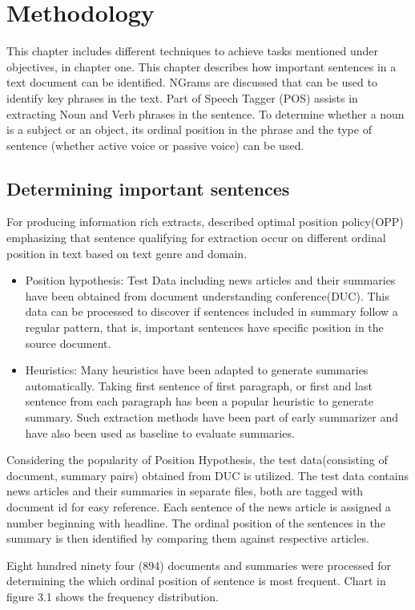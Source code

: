 \chapter{Methodology}
This chapter includes different techniques to achieve tasks mentioned under objectives, in chapter one. This chapter describes how important sentences in a text document
can be identified. NGrams are discussed that can be used to identify key phrases in the text. Part of Speech Tagger (POS) assists in extracting Noun and Verb phrases
in the sentence. To determine whether a noun is a subject or an object, its ordinal position in the phrase and the type of sentence (whether active voice or passive
 voice) can 
be used. 

\section{Determining important sentences}
 For producing information rich extracts,  described optimal position policy(OPP) emphasizing that sentence qualifying for extraction occur on different 
 ordinal position in text based on text genre and domain. 
\begin{itemize}
 \item Position hypothesis: Test Data including news articles and their summaries have been obtained from document understanding conference(DUC). This data can be processed
to discover if sentences included in summary follow a regular pattern, that is, important sentences have specific position in the source document. 
 \item Heuristics: Many heuristics have been adapted to generate summaries automatically. Taking first sentence of first paragraph, or first and last sentence from each paragraph
 has been a popular heuristic to generate summary. Such extraction methods have been part of early summarizer and have also been used as  baseline to evaluate summaries. 
\end{itemize}

Considering the popularity of Position Hypothesis, the test data(consisting of document, summary pairs) obtained from DUC is utilized. The test data contains news articles
and their summaries in separate files, both are tagged with document id for easy reference. Each sentence of the news article is assigned a number beginning with headline. 
The ordinal position of the sentences in the summary is then identified by comparing them against respective articles. 

Eight hundred ninety four (894) documents and summaries were processed for determining the which ordinal position of sentence is most frequent. Chart in figure 3.1 
shows the frequency distribution. 

